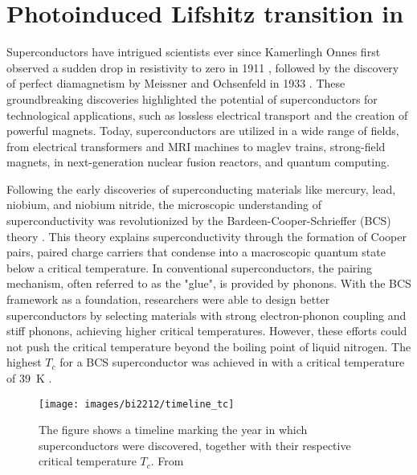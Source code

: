 \chapter{Photoinduced Lifshitz transition in }
\label{ch:bi2212}

Superconductors have intrigued scientists ever since Kamerlingh Onnes first observed a sudden drop in resistivity to zero in 1911 \cite{van_delft_discovery_2010}, followed by the discovery of perfect diamagnetism by Meissner and Ochsenfeld in 1933 \cite{meissner_neuer_1933}.
These groundbreaking discoveries highlighted the potential of superconductors for technological applications, such as lossless electrical transport and the creation of powerful magnets.
Today, superconductors are utilized in a wide range of fields, from electrical transformers and MRI machines to maglev trains, strong-field magnets, in next-generation nuclear fusion reactors, and quantum computing.

Following the early discoveries of superconducting materials like mercury, lead, niobium, and niobium nitride, the microscopic understanding of superconductivity was revolutionized by the Bardeen-Cooper-Schrieffer (BCS) theory \cite{bardeen_theory_1957}.
This theory explains superconductivity through the formation of Cooper pairs, paired charge carriers that condense into a macroscopic quantum state below a critical temperature.
In conventional superconductors, the pairing mechanism, often referred to as the "glue", is provided by phonons.
With the BCS framework as a foundation, researchers were able to design better superconductors by selecting materials with strong electron-phonon coupling and stiff phonons, achieving higher critical temperatures.
However, these efforts could not push the critical temperature beyond the boiling point of liquid nitrogen.
The highest $T_c$ for a BCS superconductor was achieved in  with a critical temperature of \qty{39}{\kelvin} \cite{nagamatsu_superconductivity_2001}.

\begin{figure}
	\centering
	\texttt{[image: images/bi2212/timeline\_tc]}
	\caption{The figure shows a timeline marking the year in which superconductors were discovered, together with their respective critical temperature $T_c$. From \cite{pjray_english_2015}}
	\label{fig:timeline}
\end{figure}

